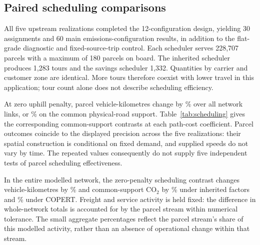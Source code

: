 
\subsection{Paired scheduling comparisons}
All five upstream realizations completed the 12-configuration design, yielding
30 assignments and 60 main emissions-configuration results, in addition to the
flat-grade diagnostic and fixed-source-trip control. Each scheduler serves
228,707 parcels with a maximum of 180 parcels on board. The inherited scheduler
produces 1,283 tours and the savings scheduler 1,332. Quantities by carrier and
customer zone are identical. More tours therefore coexist with lower travel
in this application; tour count alone does not describe scheduling efficiency.

At zero uphill penalty, parcel vehicle-kilometres change by
\SchedulingParcelNetworkVktMean\% over all network links, or
\SchedulingParcelVktMean\% on the common physical-road support.
Table~\ref{tab:scheduling} gives the corresponding common-support contrasts
at each path-cost coefficient. Parcel outcomes coincide to the displayed
precision across the five realizations: their spatial construction is
conditional on fixed demand, and supplied speeds do not vary by time.
The repeated values consequently do not supply five independent tests of
parcel scheduling effectiveness.

\begin{table}[htbp]
\centering
\caption{Savings scheduler relative to corrected inherited scheduling.
Paired percentage changes use common physical-road support; $u$ is the uphill
cost coefficient. Values are means; each parcel contrast coincides across realizations
at the shown precision.}
\label{tab:scheduling}

\end{table}

In the entire modelled network, the zero-penalty scheduling contrast changes
vehicle-kilometres by \SchedulingNetworkVktMean\% and common-support CO$_2$ by
\SchedulingFactorCoMean\% under inherited factors and
\SchedulingCopertCoMean\% under COPERT. Freight and service activity is held
fixed: the difference in whole-network totals is accounted for by the parcel
stream within numerical tolerance. The small aggregate percentages reflect
the parcel stream's share of this modelled activity, rather than an absence
of operational change within that stream.

